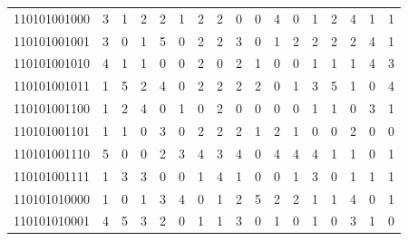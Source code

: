 \documentclass[10pt,a4paper]{article}
\begin{document}
\begin{longtable}{ |c|c|c|c|c|c|c|c|c|c|c|c|c|c|c|c|c| }
    110101001000              & 3                            & 1                                & 2                            & 2                              & 1   & 2   & 2   & 0   & 0   & 4   & 0   & 1   & 2   & 4   & 1   & 1   \\
    110101001001              & 3                            & 0                                & 1                            & 5                              & 0   & 2   & 2   & 3   & 0   & 1   & 2   & 2   & 2   & 2   & 4   & 1   \\
    110101001010              & 4                            & 1                                & 1                            & 0                              & 0   & 2   & 0   & 2   & 1   & 0   & 0   & 1   & 1   & 1   & 4   & 3   \\
    110101001011              & 1                            & 5                                & 2                            & 4                              & 0   & 2   & 2   & 2   & 2   & 0   & 1   & 3   & 5   & 1   & 0   & 4   \\
    110101001100              & 1                            & 2                                & 4                            & 0                              & 1   & 0   & 2   & 0   & 0   & 0   & 0   & 1   & 1   & 0   & 3   & 1   \\
    110101001101              & 1                            & 1                                & 0                            & 3                              & 0   & 2   & 2   & 2   & 1   & 2   & 1   & 0   & 0   & 2   & 0   & 0   \\
    110101001110              & 5                            & 0                                & 0                            & 2                              & 3   & 4   & 3   & 4   & 0   & 4   & 4   & 4   & 1   & 1   & 0   & 1   \\
    110101001111              & 1                            & 3                                & 3                            & 0                              & 0   & 1   & 4   & 1   & 0   & 0   & 1   & 3   & 0   & 1   & 1   & 1   \\
    110101010000              & 1                            & 0                                & 1                            & 3                              & 4   & 0   & 1   & 2   & 5   & 2   & 2   & 1   & 1   & 4   & 0   & 1   \\
    110101010001              & 4                            & 5                                & 3                            & 2                              & 0   & 1   & 1   & 3   & 0   & 1   & 0   & 1   & 0   & 3   & 1   & 0   \\

\end{longtable}
\end{document}
